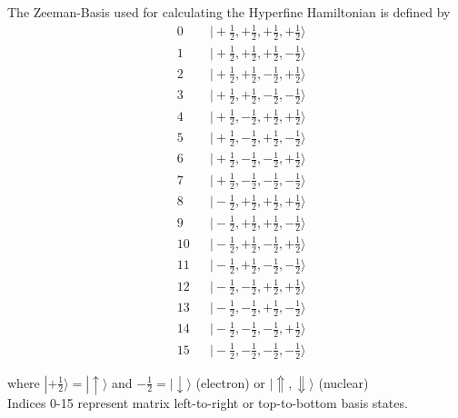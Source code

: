 \documentclass[svgnames]{article}
\begin{document}
The Zeeman-Basis used for calculating the Hyperfine Hamiltonian is defined by 
\begin{align*}
  &0 &&\bigl|+\tfrac{1}{2}, +\tfrac{1}{2}, +\tfrac{1}{2}, +\tfrac{1}{2}\bigr\rangle\\
  &1 &&\bigl|+\tfrac{1}{2}, +\tfrac{1}{2}, +\tfrac{1}{2}, -\tfrac{1}{2}\bigr\rangle\\
  &2 &&\bigl|+\tfrac{1}{2}, +\tfrac{1}{2}, -\tfrac{1}{2}, +\tfrac{1}{2}\bigr\rangle\\
  &3 &&\bigl|+\tfrac{1}{2}, +\tfrac{1}{2}, -\tfrac{1}{2}, -\tfrac{1}{2}\bigr\rangle\\
  &4 &&\bigl|+\tfrac{1}{2}, -\tfrac{1}{2}, +\tfrac{1}{2}, +\tfrac{1}{2}\bigr\rangle\\
  &5 &&\bigl|+\tfrac{1}{2}, -\tfrac{1}{2}, +\tfrac{1}{2}, -\tfrac{1}{2}\bigr\rangle\\
  &6 &&\bigl|+\tfrac{1}{2}, -\tfrac{1}{2}, -\tfrac{1}{2}, +\tfrac{1}{2}\bigr\rangle\\
  &7 &&\bigl|+\tfrac{1}{2}, -\tfrac{1}{2}, -\tfrac{1}{2}, -\tfrac{1}{2}\bigr\rangle\\
  &8 &&\bigl|-\tfrac{1}{2}, +\tfrac{1}{2}, +\tfrac{1}{2}, +\tfrac{1}{2}\bigr\rangle\\
  &9 &&\bigl|-\tfrac{1}{2}, +\tfrac{1}{2}, +\tfrac{1}{2}, -\tfrac{1}{2}\bigr\rangle\\
  &10 &&\bigl|-\tfrac{1}{2}, +\tfrac{1}{2}, -\tfrac{1}{2}, +\tfrac{1}{2}\bigr\rangle\\
  &11 &&\bigl|-\tfrac{1}{2}, +\tfrac{1}{2}, -\tfrac{1}{2}, -\tfrac{1}{2}\bigr\rangle\\
  &12 &&\bigl|-\tfrac{1}{2}, -\tfrac{1}{2}, +\tfrac{1}{2}, +\tfrac{1}{2}\bigr\rangle\\
  &13 &&\bigl|-\tfrac{1}{2}, -\tfrac{1}{2}, +\tfrac{1}{2}, -\tfrac{1}{2}\bigr\rangle\\
  &14 &&\bigl|-\tfrac{1}{2}, -\tfrac{1}{2}, -\tfrac{1}{2}, +\tfrac{1}{2}\bigr\rangle\\
  &15 &&\bigl|-\tfrac{1}{2}, -\tfrac{1}{2}, -\tfrac{1}{2}, -\tfrac{1}{2}\bigr\rangle
\end{align*}

where $|+\frac{1}{2}\rangle = |\uparrow\rangle$ and $-\frac{1}{2} =
|\downarrow\rangle$ (electron) or $|\Uparrow, \Downarrow\rangle$ (nuclear) \\

\vspace{5px} 
Indices 0-15 represent matrix left-to-right or top-to-bottom basis states. 
\end{document}
